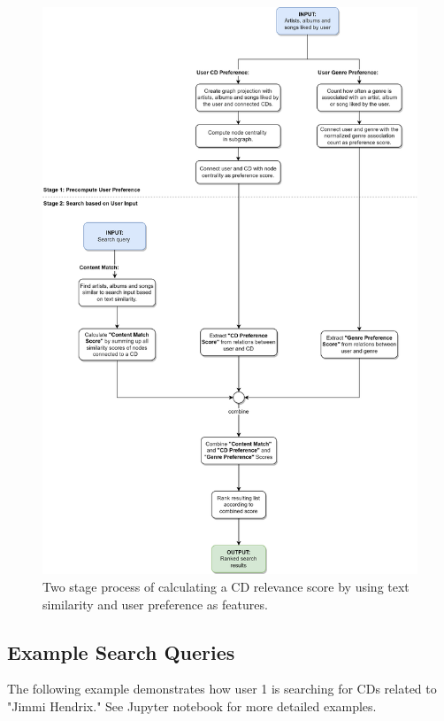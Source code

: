 \documentclass{article}
\begin{document}
\begin{figure}[ht]
    \centering
    \includegraphics[width=11.5cm]{../Figures/search.png}
    \caption{Two stage process of calculating a CD relevance score by using text similarity and user preference as features.}
\end{figure}

\subsection{Example Search Queries}

The following example demonstrates how user 1 is searching for CDs related to "Jimmi Hendrix."
See Jupyter notebook  for more detailed examples.

\end{document}
